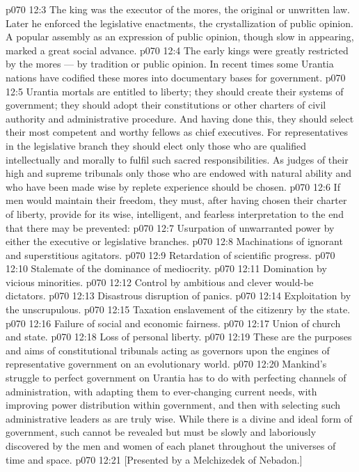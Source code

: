 \vs p070 12:3 The king was the executor of the mores, the original or unwritten law. Later he enforced the legislative enactments, the crystallization of public opinion. A popular assembly as an expression of public opinion, though slow in appearing, marked a great social advance.
\vs p070 12:4 The early kings were greatly restricted by the mores --- by tradition or public opinion. In recent times some Urantia nations have codified these mores into documentary bases for government.
\vs p070 12:5 \pc Urantia mortals are entitled to liberty; they should create their systems of government; they should adopt their constitutions or other charters of civil authority and administrative procedure. And having done this, they should select their most competent and worthy fellows as chief executives. For representatives in the legislative branch they should elect only those who are qualified intellectually and morally to fulfil such sacred responsibilities. As judges of their high and supreme tribunals only those who are endowed with natural ability and who have been made wise by replete experience should be chosen.
\vs p070 12:6 If men would maintain their freedom, they must, after having chosen their charter of liberty, provide for its wise, intelligent, and fearless interpretation to the end that there may be prevented:
\vs p070 12:7 \bibnobreakspace Usurpation of unwarranted power by either the executive or legislative branches.
\vs p070 12:8 \bibnobreakspace Machinations of ignorant and superstitious agitators.
\vs p070 12:9 \bibnobreakspace Retardation of scientific progress.
\vs p070 12:10 \bibnobreakspace Stalemate of the dominance of mediocrity.
\vs p070 12:11 \bibnobreakspace Domination by vicious minorities.
\vs p070 12:12 \bibnobreakspace Control by ambitious and clever would\hyp{}be dictators.
\vs p070 12:13 \bibnobreakspace Disastrous disruption of panics.
\vs p070 12:14 \bibnobreakspace Exploitation by the unscrupulous.
\vs p070 12:15 \bibnobreakspace Taxation enslavement of the citizenry by the state.
\vs p070 12:16 \bibnobreakspace Failure of social and economic fairness.
\vs p070 12:17 \bibnobreakspace Union of church and state.
\vs p070 12:18 \bibnobreakspace Loss of personal liberty.
\vs p070 12:19 \pc These are the purposes and aims of constitutional tribunals acting as governors upon the engines of representative government on an evolutionary world.
\vs p070 12:20 Mankind’s struggle to perfect government on Urantia has to do with perfecting channels of administration, with adapting them to ever\hyp{}changing current needs, with improving power distribution within government, and then with selecting such administrative leaders as are truly wise. While there is a divine and ideal form of government, such cannot be revealed but must be slowly and laboriously discovered by the men and women of each planet throughout the universes of time and space.
\vsetoff
\vs p070 12:21 [Presented by a Melchizedek of Nebadon.]
\quizlink
